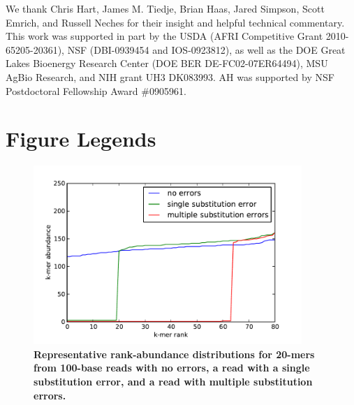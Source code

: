 \documentclass[10pt]{article}
\begin{document}
We thank Chris Hart, James M. Tiedje, Brian Haas, Jared Simpson, Scott
Emrich, and Russell Neches for their insight and helpful technical
commentary.  This work was supported in part by the USDA (AFRI
Competitive Grant 2010-65205-20361), NSF (DBI-0939454 and
IOS-0923812), as well as the DOE Great Lakes Bioenergy Research Center
(DOE BER DE-FC02-07ER64494), MSU AgBio Research, and NIH grant UH3
DK083993.  AH was supported by NSF Postdoctoral Fellowship Award
\#0905961.



\newpage

\section*{Figure Legends}

\begin{figure}
\centerline{\includegraphics[width=4in]{diginorm-ranks.pdf}}
\caption{
{\bf Representative rank-abundance distributions for 20-mers from 100-base reads with no errors,
a read with a single substitution error, and a read with multiple
substitution errors.}}
\label{fig:rankabund}
\end{figure}
\end{document}
